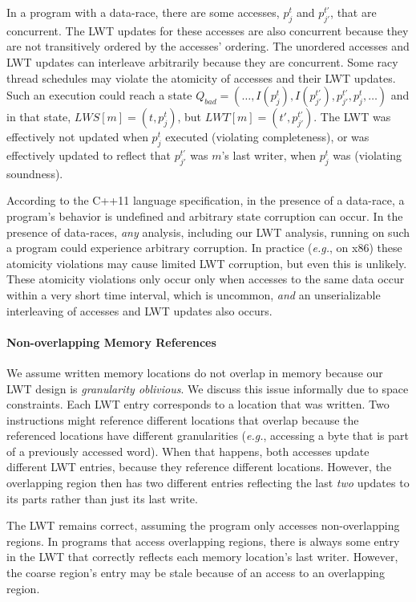 \documentclass[preprint,9pt]{sigplanconf}
\newcommand{\lwt}{LWT\xspace}
\begin{document}
In a program with a data-race, there are some accesses, $p^{t}_{j}$ and
$p^{t'}_{j'}$, that are concurrent.  The \lwt updates for these accesses are
also concurrent because they are not transitively ordered by the accesses' ordering.  The unordered accesses and \lwt updates can interleave arbitrarily
because they are concurrent.  Some racy thread schedules may violate the
atomicity of accesses and their \lwt updates.  Such an execution could reach a
state $Q_{bad} = (\ldots, I(p^{t}_{j}), I(p^{t'}_{j'}), p^{t'}_{j'}, p^{t}_{j},
\ldots)$ and in that state, $LWS[m] = (t,p^{t}_{j})$, but $LWT[m] =
(t',p^{t'}_{j'})$.  The \lwt was effectively not updated when $p^{t}_{j}$
executed (violating completeness), or was effectively updated to reflect that
$p^{t'}_{j'}$ was $m$'s last writer, when $p^{t}_{j}$ was (violating
soundness).    

According to the C++11 language specification, in the presence of a data-race,
a program's behavior is undefined and arbitrary state corruption can occur.  In
the presence of data-races, {\em any} analysis, including our \lwt analysis,
running on such a program could experience arbitrary corruption.  In practice
({\em e.g.}, on x86) these atomicity violations may cause limited \lwt
corruption, but even this is unlikely.  These atomicity violations only occur
only when accesses to the same data occur within a very short time interval,
which is uncommon, {\em and} an unserializable interleaving of accesses and
\lwt updates also occurs.

\paragraph{Non-overlapping Memory References} 
We assume written memory locations do not overlap in memory because our \lwt
design is {\em granularity oblivious}.  We discuss this issue informally due to
space constraints.  Each \lwt entry corresponds to a location that was written.
Two instructions might reference different locations that overlap because the
referenced locations have different granularities ({\em e.g.}, accessing a byte
that is part of a previously accessed word).  When that happens, both accesses
update different \lwt entries, because they reference different locations.
However, the overlapping region then has two different entries reflecting the
last {\em two} updates to its parts rather than just its last write.

The \lwt remains correct, assuming the program only accesses non-overlapping
regions.  In programs that access overlapping regions, there is always some
entry in the \lwt that correctly reflects each memory location's last writer.
However, the coarse region's entry may be stale because of an
access to an overlapping region.
\end{document}
